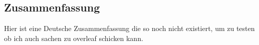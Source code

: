 %
\pagestyle{empty}

\subsection*{Zusammenfassung}

Hier ist eine Deutsche Zusammenfassung die so noch nicht existiert, um zu testen ob ich auch sachen zu overleaf schicken kann.

\cleardoublepage